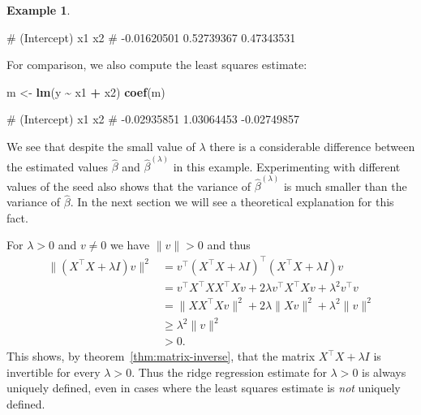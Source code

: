 \documentclass[
  a4paper,
]{article}
\newenvironment{Shaded}{\begin{snugshade}}{\end{snugshade}}
\newcommand{\FunctionTok}[1]{\textcolor[rgb]{0.13,0.29,0.53}{\textbf{#1}}}
\newcommand{\NormalTok}[1]{#1}
\newcommand{\OtherTok}[1]{\textcolor[rgb]{0.56,0.35,0.01}{#1}}
\newcommand{\SpecialCharTok}[1]{\textcolor[rgb]{0.81,0.36,0.00}{\textbf{#1}}}
\theoremstyle{definition}
\theoremstyle{definition}
\newtheorem{example}{Example}[section]
\theoremstyle{definition}
\theoremstyle{definition}
\theoremstyle{remark}
\begin{document}
\begin{example}
\begin{Shaded}
\begin{Highlighting}[]
\NormalTok{\# (Intercept)          x1          x2 }
\NormalTok{\# {-}0.01620501  0.52739367  0.47343531}
\end{Highlighting}
\end{Shaded}

For comparison, we also compute the least squares estimate:

\begin{Shaded}
\begin{Highlighting}[]
\NormalTok{m }\OtherTok{\textless{}{-}} \FunctionTok{lm}\NormalTok{(y }\SpecialCharTok{\textasciitilde{}}\NormalTok{ x1 }\SpecialCharTok{+}\NormalTok{ x2)}
\FunctionTok{coef}\NormalTok{(m)}
\end{Highlighting}
\end{Shaded}

\begin{Shaded}
\begin{Highlighting}[]
\NormalTok{\# (Intercept)          x1          x2 }
\NormalTok{\# {-}0.02935851  1.03064453 {-}0.02749857}
\end{Highlighting}
\end{Shaded}

We see that despite the small value of \(\lambda\) there is a considerable
difference between the estimated values \(\hat\beta\) and
\(\hat\beta^{(\lambda)}\) in this example. Experimenting with different
values of the seed also shows that the variance of \(\hat\beta^{(\lambda)}\)
is much smaller than the variance of \(\hat\beta\). In the next section
we will see a theoretical explanation for this fact.
\end{example}

For \(\lambda > 0\) and \(v \neq 0\) we have \(\|v\| > 0\) and thus
\begin{align*}
  \| (X^\top X + \lambda I) v \|^2
  &= v^\top (X^\top X + \lambda I)^\top (X^\top X + \lambda I) v \\
  &= v^\top X^\top X X^\top X v + 2 \lambda v^\top X^\top X v + \lambda^2 v^\top v \\
  &= \| X X^\top X v \|^2 + 2 \lambda \| X v \|^2 + \lambda^2 \| v \|^2 \\
  &\geq \lambda^2 \| v \|^2 \\
  &> 0.
\end{align*}
This shows, by theorem~\ref{thm:matrix-inverse}, that
the matrix \(X^\top X + \lambda I\)
is invertible for every \(\lambda > 0\). Thus the
ridge regression estimate for \(\lambda > 0\) is always uniquely defined,
even in cases where the least squares estimate is \emph{not} uniquely defined.
\end{document}

